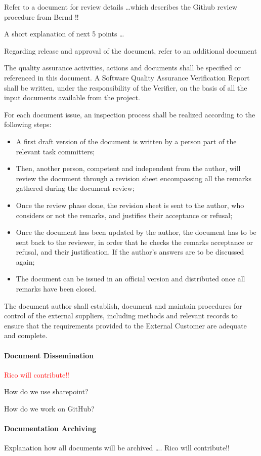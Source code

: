 \documentclass{template/openetcs_article}
\begin{document}
Refer to a document for review details {\dots}which describes the Github review procedure from Bernd !!

A short explanation of next 5 points {\dots}

Regarding release and approval of the document, refer to an additional document 

The quality assurance activities, actions and documents shall be specified or referenced in this document. A Software Quality Assurance Verification Report shall be written, under the responsibility of the Verifier, on the basis of all the input documents available from the project.

For each document issue, an inspection process shall be realized according to the following steps:
\begin{itemize}
\item A first draft version of the document is written by a person part of the relevant task committers;
\item Then, another person, competent and independent from the author, will review the document through a revision sheet encompassing all the remarks gathered during the document review;
\item Once the review phase done, the revision sheet is sent to the author, who considers or not the remarks, and justifies their acceptance or refusal;
\item Once the document has been updated by the author, the document has to be sent back to the reviewer, in order that he checks the remarks acceptance or refusal, and their justification. If the author{\textquoteright}s answers are to be discussed again;
\item The document can be issued in an official version and distributed once all remarks have been closed.
\end{itemize}
The document author shall establish, document and maintain procedures for control of the external suppliers, including methods and relevant records to ensure that the requirements provided to the External Customer are adequate and complete.

\paragraph{Document Dissemination }
\textcolor{red}{Rico will contribute!!}

How do we use sharepoint?

How do we work on GitHub?

\paragraph{Documentation Archiving}
Explanation how all documents will be archived {\dots}. Rico will contribute!!
\end{document}
